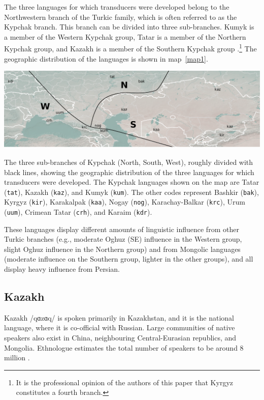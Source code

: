 \documentclass[a4paper,11pt,twocolumn]{article}
\begin{document}
The three languages for which transducers were developed belong to the Northwestern branch of the Turkic family, which is often referred to as the Kypchak branch.  This branch can be divided into three sub-branches.  Kumyk is a member of the Western Kypchak group, Tatar is a member of the Northern Kypchak group, and Kazakh is a member of the Southern Kypchak group \citep[82-83]{histofturkic}.\footnote{It is the professional opinion of the authors of this paper that Kyrgyz constitutes a fourth branch.}   The geographic distribution of the languages is shown in map~\ref{map1}.

\begin{map*}[htbp]
	\includegraphics[width=\textwidth]{map/map}
	\caption{The three sub-branches of Kypchak (North, South, West), roughly divided with black lines, showing the geographic distribution of the three languages for which transducers were developed.  The Kypchak languages shown on the map are Tatar (\texttt{tat}), Kazakh (\texttt{kaz}), and Kumyk (\texttt{kum}). The other codes represent Bashkir (\texttt{bak}), Kyrgyz (\texttt{kir}), Karakalpak (\texttt{kaa}), Nogay (\texttt{nog}), Karachay-Balkar (\texttt{krc}), Urum (\texttt{uum}), Crimean Tatar (\texttt{crh}), and Karaim (\texttt{kdr}).}
	\label{map1}
\end{map*}

These languages display different amounts of linguistic influence from other Turkic branches (e.g., moderate Oghuz (SE) influence in the Western group, slight Oghuz influence in the Northern group) and from Mongolic languages (moderate influence on the Southern group, lighter in the other groups), and all display heavy influence from Persian.

\subsection{Kazakh}
Kazakh /q{\symbl ɑ}z{\symbl ɑ}q/ is spoken primarily in Kazakhstan, and it is the national language, where it is co-official with Russian.  Large communities of native speakers also exist in China, neighbouring Central-Eurasian republics, and Mongolia. Ethnologue estimates
the total number of speakers to be around 8 million \citep{ethnologue}.
\end{document}
